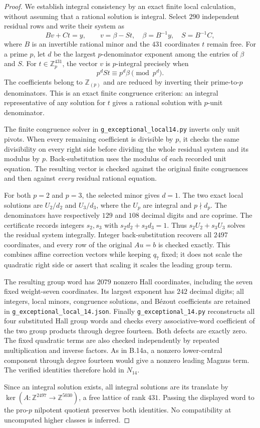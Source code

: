 \begin{proof}
We establish integral consistency by an exact finite local
calculation, without assuming that a rational solution is
integral. Select $290$ independent residual rows and write
their system as
\[
 Bv+Ct=y,\qquad
 v=\beta-St,\quad
 \beta=B^{-1}y,\quad S=B^{-1}C,
\]
where $B$ is an invertible rational minor and the $431$
coordinates $t$ remain free. For a prime $p$, let $d$ be
the largest $p$-denominator exponent among the entries of
$\beta$ and $S$. For $t\in\mathbb Z_p^{431}$, the vector
$v$ is $p$-integral precisely when
\[
 p^dSt\equiv p^d\beta\pmod{p^d}.
\]
The coefficients belong to $\mathbb Z_{(p)}$ and are
reduced by inverting their prime-to-$p$ denominators.
This is an exact finite congruence criterion: an integral
representative of any solution for $t$ gives a rational
solution with $p$-unit denominator.

The finite congruence solver in
\texttt{g\_exceptional\_local14.py} inverts only unit
pivots. When every remaining coefficient is divisible by
$p$, it checks the same divisibility on every right side
before dividing the whole residual system and its modulus
by $p$. Back-substitution uses the modulus of each recorded
unit equation. The resulting vector is checked against
the original finite congruences and then against
\emph{every} residual rational equation.

For both $p=2$ and $p=3$, the selected minor gives $d=1$.
The two exact local solutions are $U_2/d_2$ and $U_3/d_3$,
where the $U_p$ are integral and $p\nmid d_p$.
The denominators have respectively $129$ and $108$ decimal
digits and are coprime. The certificate records integers
$s_2,s_3$ with $s_2d_2+s_3d_3=1$.
Thus $s_2U_2+s_3U_3$ solves the residual system integrally.
Integer back-substitution recovers all $2497$ coordinates,
and every row of the original $Au=b$ is checked exactly.
This combines affine correction vectors while keeping
$q_7$ fixed; it does not scale the quadratic right side or
assert that scaling it scales the leading group term.

The resulting group word has $2079$ nonzero Hall
coordinates, including the seven fixed weight-seven
coordinates. Its largest exponent has $242$ decimal
digits; all integers, local minors, congruence solutions,
and B\'ezout coefficients are retained in
\texttt{g\_exceptional\_local\_14.json}.
Finally \texttt{g\_exceptional\_14.py} reconstructs all
four substituted Hall group words and checks every
associative-word coefficient of the two group products
through degree fourteen. Both defects are exactly zero.
The fixed quadratic terms are also checked independently
by repeated multiplication and inverse factors.
As in B.14a, a nonzero lower-central component through
degree fourteen would give a nonzero leading Magnus term.
The verified identities therefore hold in $N_{14}$.

Since an integral solution exists, all integral solutions
are its translate by $\ker(A:\mathbb Z^{2497}\to
\mathbb Z^{5030})$, a free lattice of rank $431$.
Passing the displayed word to the pro-$p$ nilpotent quotient
preserves both identities. No compatibility at uncomputed
higher classes is inferred.
\end{proof}
